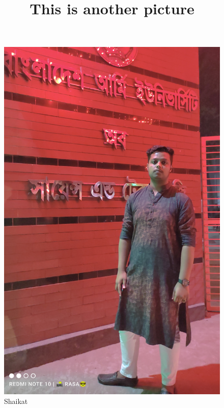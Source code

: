 \documentclass{article}
\begin{document}
\begin{figure}
			\title{This is another picture}

	\includegraphics[width=\linewidth]{me.jpg}
	\caption{Shaikat}
\end{figure}	
\end{document}
